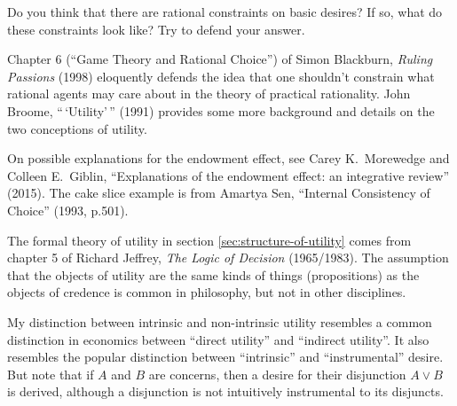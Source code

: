 \begin{essay}
  Do you think that there are rational constraints on basic desires? If so, what
  do these constraints look like? Try to defend your answer.
\end{essay}

\begin{sources}

  Chapter 6 (``Game Theory and Rational Choice'') of Simon Blackburn,
  \emph{Ruling Passions} (1998) eloquently defends the idea that one shouldn't
  constrain what rational agents may care about in the theory of practical
  rationality. John Broome, ``\,`Utility'\,'' (1991) provides some more
  background and details on the two conceptions of utility.

  On possible explanations for the endowment effect, see Carey K.\ Morewedge and
  Colleen E.\ Giblin, ``Explanations of the endowment effect: an integrative
  review'' (2015). The cake slice example is from Amartya Sen, ``Internal
  Consistency of Choice'' (1993, p.501).

  The formal theory of utility in section \ref{sec:structure-of-utility} comes
  from chapter 5 of Richard Jeffrey, \emph{The Logic of Decision} (1965/1983).
  The assumption that the objects of utility are the same kinds of things
  (propositions) as the objects of credence is common in philosophy, but not in
  other disciplines.
  
  My distinction between intrinsic and non-intrinsic utility resembles a common
  distinction in economics between ``direct utility'' and ``indirect utility''.
  It also resembles the popular distinction between ``intrinsic'' and
  ``instrumental'' desire. But note that if $A$ and $B$ are concerns, then a
  desire for their disjunction $A \lor B$ is derived, although a disjunction is
  not intuitively instrumental to its disjuncts.

\end{sources}

  

